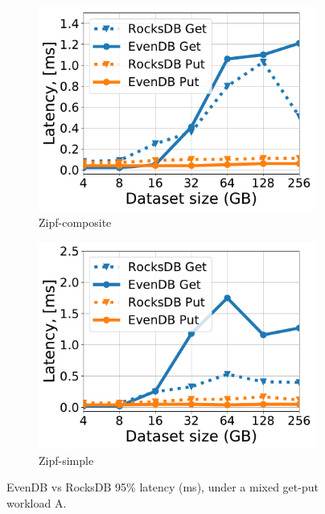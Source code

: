 \documentclass[sigplan,10pt]{acmart}
\newcommand{\sys}{EvenDB}
\providecommand{\DIFaddend}{} %
\begin{document}
\DIFaddend \begin{figure}[htb]
\centering
\begin{subfigure}{0.49\linewidth}
\includegraphics[width=\textwidth]{figs/tail_flurry_line.pdf}
\caption{Zipf-composite}
\label{fig:tail_latency:co}
\end{subfigure}
\begin{subfigure}{0.49\linewidth}
\includegraphics[width=\textwidth]{figs/tail_zipf_line.pdf}
\caption{Zipf-simple}
\label{fig:tail_latency:si}
\end{subfigure}
\caption{{\sys\/ vs RocksDB 95\% latency (ms), under a mixed get-put workload A.}}
\label{fig:tail_latency}
\end{figure}
\end{document}
